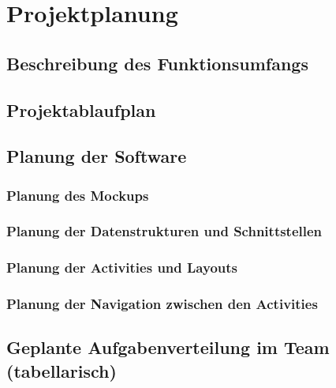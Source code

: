 \section{Projektplanung}

\subsection{Beschreibung des Funktionsumfangs}

\subsection{Projektablaufplan}

\subsection{Planung der Software}

\subsubsection{Planung des Mockups}

\subsubsection{Planung der Datenstrukturen und Schnittstellen}

\subsubsection{Planung der Activities und Layouts}

\subsubsection{Planung der Navigation zwischen den Activities}

\subsection{Geplante Aufgabenverteilung im Team (tabellarisch)}